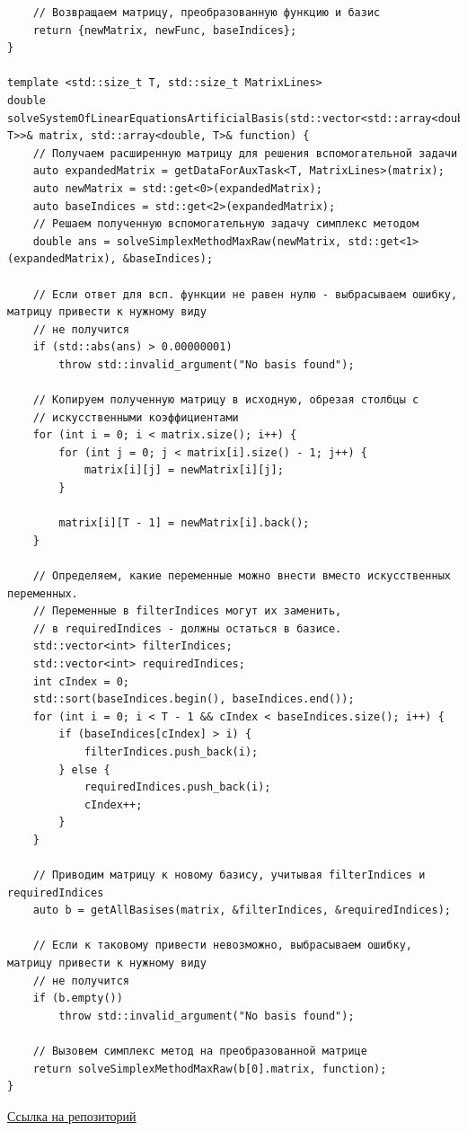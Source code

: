 \documentclass[a4paper,14pt]{extarticle}
\begin{document}
\begin{verbatim}
    // Возвращаем матрицу, преобразованную функцию и базис
    return {newMatrix, newFunc, baseIndices};
}

template <std::size_t T, std::size_t MatrixLines>
double solveSystemOfLinearEquationsArtificialBasis(std::vector<std::array<double, T>>& matrix, std::array<double, T>& function) {
    // Получаем расширенную матрицу для решения вспомогательной задачи
    auto expandedMatrix = getDataForAuxTask<T, MatrixLines>(matrix);
    auto newMatrix = std::get<0>(expandedMatrix);
    auto baseIndices = std::get<2>(expandedMatrix);
    // Решаем полученную вспомогательную задачу симплекс методом
    double ans = solveSimplexMethodMaxRaw(newMatrix, std::get<1>(expandedMatrix), &baseIndices);

    // Если ответ для всп. функции не равен нулю - выбрасываем ошибку, матрицу привести к нужному виду 
    // не получится
    if (std::abs(ans) > 0.00000001) 
        throw std::invalid_argument("No basis found");
    
    // Копируем полученную матрицу в исходную, обрезая столбцы с 
    // искусственными коэффициентами
    for (int i = 0; i < matrix.size(); i++) {
        for (int j = 0; j < matrix[i].size() - 1; j++) {
            matrix[i][j] = newMatrix[i][j];
        }

        matrix[i][T - 1] = newMatrix[i].back();
    }

    // Определяем, какие переменные можно внести вместо искусственных переменных. 
    // Переменные в filterIndices могут их заменить, 
    // в requiredIndices - должны остаться в базисе.
    std::vector<int> filterIndices;
    std::vector<int> requiredIndices;
    int cIndex = 0;
    std::sort(baseIndices.begin(), baseIndices.end());
    for (int i = 0; i < T - 1 && cIndex < baseIndices.size(); i++) {
        if (baseIndices[cIndex] > i) {
            filterIndices.push_back(i);
        } else {
            requiredIndices.push_back(i);
            cIndex++;
        }
    }

    // Приводим матрицу к новому базису, учитывая filterIndices и requiredIndices
    auto b = getAllBasises(matrix, &filterIndices, &requiredIndices);

    // Если к таковому привести невозможно, выбрасываем ошибку, матрицу привести к нужному виду 
    // не получится
    if (b.empty()) 
        throw std::invalid_argument("No basis found");

    // Вызовем симплекс метод на преобразованной матрице
    return solveSimplexMethodMaxRaw(b[0].matrix, function);
}
    \end{verbatim}
\href{https://github.com/IAmProgrammist/operations_research/blob/master/src/libs/alg/lab3/task1.tpp}{Ссылка на репозиторий}\\
\end{document}
